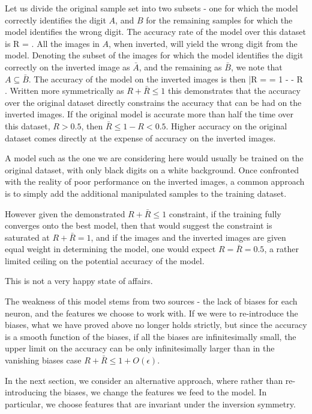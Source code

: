 \documentclass[twocolumn, prl, nofootinbib]{revtex4-1}
\begin{document}
Let us divide the original sample set into two subsets - one for which the model correctly identifies the digit $A$, and $B$ for the remaining samples for which the model identifies the wrong digit. The accuracy rate of the model over this dataset is 
\be
R = 
\; .
\ee
All the images in $A$, when inverted, will yield the wrong digit from the model. Denoting the subset of the images for which the model identifies the digit correctly on the inverted image as ${\bar A}$, and the remaining as ${\bar B}$, we note that $A \subseteq {\bar B}$. The accuracy of the model on the inverted images is then
\be
{\bar R} =  = 1 -   - R
\; .
\ee
Written more symmetrically as $R + {\bar R} \leq 1$ this demonstrates that the accuracy over the original dataset directly constrains the accuracy that can be had on the inverted images. If the original model is accurate more than half the time over this dataset, $R>0.5$, then ${\bar R} \leq 1 - R < 0.5$. Higher accuracy on the original dataset comes directly at the expense of accuracy on the inverted images.

A model such as the one we are considering here would usually be trained on the original dataset, with only black digits on a white background. Once confronted with the reality of poor performance on the inverted images, a common approach is to simply add the additional manipulated samples to the training dataset.

However given the demonstrated $R + {\bar R} \leq 1$ constraint, if the training fully converges onto the best model, then that would suggest 
the constraint is saturated at $R + {\bar R} = 1$, and if the images and the inverted images are given equal weight in determining the model, one would expect $R = {\bar R} = 0.5$, a rather limited ceiling on the potential accuracy of the model.

This is not a very happy state of affairs. 

The weakness of this model stems from two sources - the lack of biases for each neuron, and the features we choose to work with. If we were to re-introduce the biases, what we have proved above no longer holds strictly, but since the accuracy is a smooth function of the biases, if all the biases are infinitesimally small, the upper limit on the accuracy can be only infinitesimally larger than in the vanishing biases case $R + {\bar R} \leq 1 + O(\epsilon)$.

In the next section, we consider an alternative approach, where rather than re-introducing the biases, we change the features we feed to the model. In particular, we choose features that are invariant under the inversion symmetry.
\end{document}
